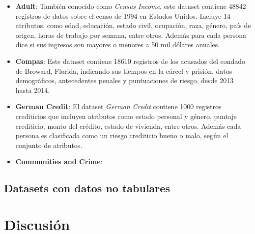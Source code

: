     \begin{itemize}
        \item \textbf{Adult}: Tambi\'en conocido como \textit{Census Income}, este dataset contiene 48842 registros de 
        datos sobre el censo de 1994 en Estados Unidos. Incluye 14 atributos, como edad, educaci\'on, estado civil,
        ocupaci\'on, raza, g\'enero, pa\'is de origen, horas de trabajo por semana, entre otros. Adem\'as para cada 
        persona dice si sus ingresos son mayores o menores a 50 mil d\'olares anuales.
        \item \textbf{Compas}: Este dataset contiene 18610 registros de los acusados del condado de Broward, Florida,
        indicando sus tiempos en la c\'arcel y prisi\'on, datos demogr\'aficos, antecedentes penales y puntuaciones 
        de riesgo, desde 2013 hasta 2014.
        \item \textbf{German Credit}: El dataset \textit{German Credit} contiene 1000 registros crediticios que incluyen atributos como estado personal y g\'enero, puntaje crediticio, monto del cr\'edito, estado de vivienda, entre otros. Adem\'as cada persona es clasificada como un riesgo crediticio bueno o malo, seg\'un el conjunto de atributos.
        \item \textbf{Communities and Crime}: 
    \end{itemize}

    \subsection{Datasets con datos no tabulares}
\section{Discusi\'on}

